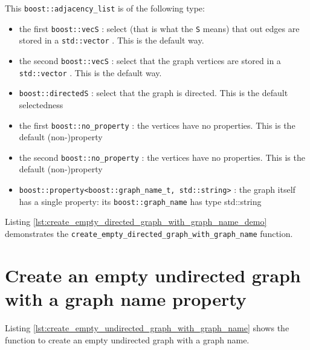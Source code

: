 This \verb;boost::adjacency_list; is of the following type:

\begin{itemize}
  \item the first \verb;boost::vecS; : 
    select (that is what the \verb;S;  means) 
    that out edges are stored in a 
    \verb;std::vector; .
    This is the default way.
  \item the second \verb;boost::vecS; : 
    select that the graph vertices are stored in a 
    \verb;std::vector; .
    This is the default way.
  \item \verb;boost::directedS; : 
    select that the graph is directed.
    This is the default selectedness
  \item the first \verb;boost::no_property; : 
    the vertices have no properties.
    This is the default (non-)property
  \item the second \verb;boost::no_property; : 
    the vertices have no properties.
    This is the default (non-)property
  \item
    \verb;boost::property<boost::graph_name_t, std::string>; 
    : 
    the graph itself has a single property: 
    its \verb;boost::graph_name;  has type std::string
\end{itemize}

Listing 
\ref{lst:create_empty_directed_graph_with_graph_name_demo}
demonstrates the \verb;create_empty_directed_graph_with_graph_name; function.



\section{Create an empty undirected graph with a graph name property}
\label{subsec:create_empty_undirected_graph_with_graph_name}

Listing 
\ref{lst:create_empty_undirected_graph_with_graph_name}
shows the function to create an empty undirected graph with a graph name.

